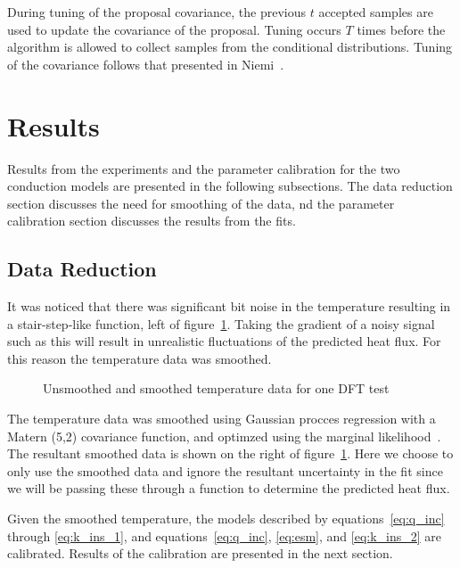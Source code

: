 \documentclass[article]{proc}
\begin{document}
        During tuning of the proposal covariance, the previous $t$ accepted samples are used to update the covariance of the proposal. Tuning occurs $T$ times before the algorithm is allowed to collect samples from the conditional distributions. Tuning of the covariance follows that presented in Niemi~\cite{Niemi:2019}. 

\section{Results}

    Results from the experiments and the parameter calibration for the two conduction models are presented in the following subsections. The data reduction section discusses the need for smoothing of the data, nd the parameter calibration section discusses the results from the fits. 

    \subsection{Data Reduction}

        It was noticed that there was significant bit noise in the temperature resulting in a stair-step-like function, left of figure~\ref{fig:tc_data}. Taking the gradient of a noisy signal such as this will result in unrealistic fluctuations of the predicted heat flux. For this reason the temperature data was smoothed.

        \begin{figure}[!]
            \centering
            \qquad
            \caption{Unsmoothed and smoothed temperature data for one DFT test}
            \label{fig:tc_data}
        \end{figure}

        The temperature data was smoothed using Gaussian procces regression with a Matern (5,2) covariance function, and optimzed using the marginal likelihood~\cite{Rasmussen:2006}. The resultant smoothed data is shown on the right of figure~\ref{fig:tc_data}. Here we choose to only use the smoothed data and ignore the resultant uncertainty in the fit since we will be passing these through a function to determine the predicted heat flux.

        Given the smoothed temperature, the models described by equations~\ref{eq:q_inc} through \ref{eq:k_ins_1}, and equations~\ref{eq:q_inc}, \ref{eq:esm}, and \ref{eq:k_ins_2} are calibrated. Results of the calibration are presented in the next section.
\end{document}
